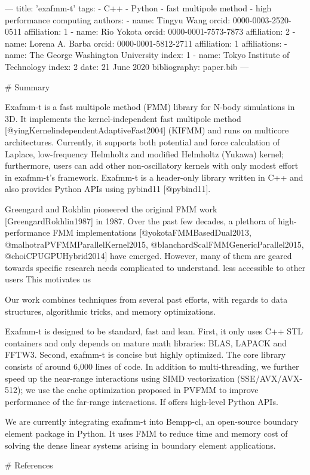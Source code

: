 ---
title: 'exafmm-t'
tags:
  - C++
  - Python
  - fast multipole method
  - high performance computing
authors:
 - name: Tingyu Wang
   orcid: 0000-0003-2520-0511
   affiliation: 1
 - name: Rio Yokota
   orcid: 0000-0001-7573-7873
   affiliation: 2
 - name: Lorena A. Barba
   orcid: 0000-0001-5812-2711
   affiliation: 1
affiliations:
 - name: The George Washington University
   index: 1
 - name: Tokyo Institute of Technology
   index: 2
date: 21 June 2020
bibliography: paper.bib
---

# Summary

Exafmm-t is a fast multipole method (FMM) library for N-body simulations in 3D.
It implements the kernel-independent fast multipole method [@yingKernelindependentAdaptiveFast2004] (KIFMM) and runs on multicore architectures. 
Currently, it supports both potential and force calculation of Laplace, low-frequency Helmholtz and modified Helmholtz (Yukawa) kernel; furthermore, users can add other non-oscillatory kernels with only modest effort in exafmm-t's framework.
Exafmm-t is a header-only library written in C++ and also provides Python APIs using pybind11 [@pybind11].


Greengard and Rokhlin pioneered the original FMM work [GreengardRokhlin1987] in 1987.
Over the past few decades, a plethora of high-performance FMM implementations [@yokotaFMMBasedDual2013, @malhotraPVFMMParallelKernel2015, @blanchardScalFMMGenericParallel2015, @choiCPUGPUHybrid2014] have emerged.
However, many of them are geared towards specific research needs complicated to understand.
less accessible to other users
This motivates us 

Our work combines techniques from several past efforts, with regards to data structures, algorithmic tricks, and memory optimizations.

Exafmm-t is designed to be standard, fast and lean.
First, it only uses C++ STL containers and only depends on mature math libraries: BLAS, LAPACK and FFTW3.
Second, exafmm-t is concise but highly optimized. The core library consists of around 6,000 lines of code.
In addition to multi-threading, we further speed up the near-range interactions using SIMD vectorization (SSE/AVX/AVX-512); we use the cache optimization proposed in PVFMM to improve performance of the far-range interactions.
If offers high-level Python APIs.



We are currently integrating exafmm-t into Bempp-cl, an open-source boundary element package in Python.
It uses FMM to reduce time and memory cost of solving the dense linear systems arising in boundary element applications.

# References
